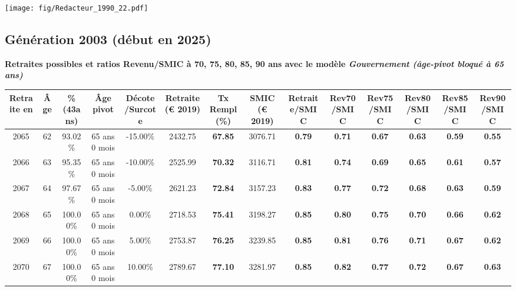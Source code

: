  \vspace{0.1cm} 

 \begin{center}\texttt{[image: fig/Redacteur\_1990\_22.pdf]}\end{center} \label{fig/Redacteur_1990_22.pdf} 

\newpage 
 
\subsection{Génération 2003 (début en 2025)} 

{\bf \noindent Retraites possibles et ratios Revenu/SMIC à 70, 75, 80, 85, 90 ans avec le modèle \emph{Gouvernement (âge-pivot bloqué à 65 ans)}}  
 
\begin{adjustbox}{max width=\textwidth} 
\begin{tabular}[htb]{|c|c||c|c|c||c|c||c||c|c|c|c|c|c|} 
\hline 
 Retraite en &  Âge &  \%(43ans) &  Âge pivot &  Décote/Surcote &  Retraite (\euro{} 2019) &  Tx Rempl(\%) &  SMIC (\euro{} 2019) &  Retraite/SMIC &  Rev70/SMIC &  Rev75/SMIC &  Rev80/SMIC &  Rev85/SMIC &  Rev90/SMIC \\ 
\hline \hline 
 2065 &  62 &  93.02\% &  65 ans 0 mois &  -15.00\% &  2432.75 &  {\bf 67.85} &  3076.71 &  {\bf {\color{red} 0.79}} &  {\bf {\color{red} 0.71}} &  {\bf {\color{red} 0.67}} &  {\bf {\color{red} 0.63}} &  {\bf {\color{red} 0.59}} &  {\bf {\color{red} 0.55}} \\ 
\hline 
 2066 &  63 &  95.35\% &  65 ans 0 mois &  -10.00\% &  2525.99 &  {\bf 70.32} &  3116.71 &  {\bf {\color{red} 0.81}} &  {\bf {\color{red} 0.74}} &  {\bf {\color{red} 0.69}} &  {\bf {\color{red} 0.65}} &  {\bf {\color{red} 0.61}} &  {\bf {\color{red} 0.57}} \\ 
\hline 
 2067 &  64 &  97.67\% &  65 ans 0 mois &  -5.00\% &  2621.23 &  {\bf 72.84} &  3157.23 &  {\bf {\color{red} 0.83}} &  {\bf {\color{red} 0.77}} &  {\bf {\color{red} 0.72}} &  {\bf {\color{red} 0.68}} &  {\bf {\color{red} 0.63}} &  {\bf {\color{red} 0.59}} \\ 
\hline 
 2068 &  65 &  100.00\% &  65 ans 0 mois &  0.00\% &  2718.53 &  {\bf 75.41} &  3198.27 &  {\bf {\color{red} 0.85}} &  {\bf {\color{red} 0.80}} &  {\bf {\color{red} 0.75}} &  {\bf {\color{red} 0.70}} &  {\bf {\color{red} 0.66}} &  {\bf {\color{red} 0.62}} \\ 
\hline 
 2069 &  66 &  100.00\% &  65 ans 0 mois &  5.00\% &  2753.87 &  {\bf 76.25} &  3239.85 &  {\bf {\color{red} 0.85}} &  {\bf {\color{red} 0.81}} &  {\bf {\color{red} 0.76}} &  {\bf {\color{red} 0.71}} &  {\bf {\color{red} 0.67}} &  {\bf {\color{red} 0.62}} \\ 
\hline 
 2070 &  67 &  100.00\% &  65 ans 0 mois &  10.00\% &  2789.67 &  {\bf 77.10} &  3281.97 &  {\bf {\color{red} 0.85}} &  {\bf {\color{red} 0.82}} &  {\bf {\color{red} 0.77}} &  {\bf {\color{red} 0.72}} &  {\bf {\color{red} 0.67}} &  {\bf {\color{red} 0.63}} \\ 
\hline 
\hline 
\end{tabular} 
\end{adjustbox} 
 
